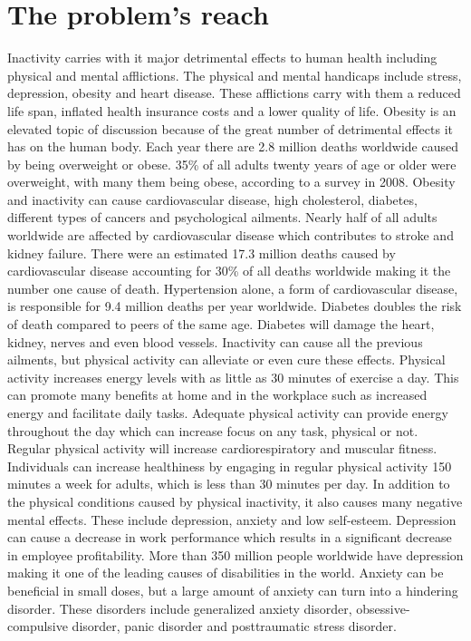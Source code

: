 \documentclass[12pt,article]{IEEEtran}
\begin{document}
	\section{The problem's reach}
	Inactivity carries with it major detrimental effects to human health including physical and mental afflictions.  The physical and mental handicaps include stress, depression, obesity and heart disease.  These afflictions carry with them a reduced life span, inflated health insurance costs and a lower quality of life.
	Obesity is an elevated topic of discussion because of the great number of detrimental effects it has on the human body.  Each year there are 2.8 million deaths worldwide caused by being overweight or obese.  35\% of all adults twenty years of age or older were overweight, with many them being obese, according to a survey in 2008. \cite{14}  Obesity and inactivity can cause cardiovascular disease, high cholesterol, diabetes, different types of cancers and psychological ailments.  Nearly half of all adults worldwide are affected by cardiovascular disease which contributes to stroke and kidney failure.  There were an estimated 17.3 million deaths caused by cardiovascular disease accounting for 30\% of all deaths worldwide making it the number one cause of death. \cite{4}  Hypertension alone, a form of cardiovascular disease, is responsible for 9.4 million deaths per year worldwide. \cite{3}  Diabetes doubles the risk of death compared to peers of the same age.  Diabetes will damage the heart, kidney, nerves and even blood vessels. \cite{15}
	Inactivity can cause all the previous ailments, but physical activity can alleviate or even cure these effects. Physical activity increases energy levels with as little as 30 minutes of exercise a day. \cite{16, p.805} This can promote many benefits at home and in the workplace such as increased energy and facilitate daily tasks.  Adequate physical activity can provide energy throughout the day which can increase focus on any task, physical or not. \cite{17, p1447}  Regular physical activity will increase cardiorespiratory and muscular fitness. \cite{3} Individuals can increase healthiness by engaging in regular physical activity 150 minutes a week for adults, which is less than 30 minutes per day. \cite{18}
	In addition to the physical conditions caused by physical inactivity, it also causes many negative mental effects.  These include depression, anxiety and low self-esteem.  Depression can cause a decrease in work performance which results in a significant decrease in employee profitability. \cite{11, p.12}  More than 350 million people worldwide have depression making it one of the leading causes of disabilities in the world.  \cite{12} Anxiety can be beneficial in small doses, but a large amount of anxiety can turn into a hindering disorder. These disorders include generalized anxiety disorder, obsessive-compulsive disorder, panic disorder and posttraumatic stress disorder. \cite{13}  
\end{document}
